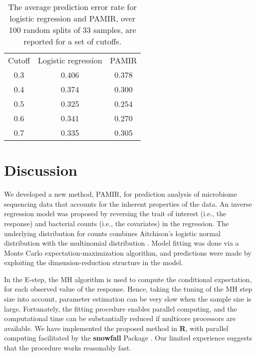 \documentclass[12pt]{article}
\begin{document}
\begin{table}[htb!]\caption{The average prediction error rate for logistic regression and PAMIR, over 100 random splits of 33 samples, are reported for a set of cutoffs.} \label{cutpoints} \vspace{-0.3cm}
\centering
 {\small\scriptsize%
\renewcommand{\arraystretch}{1} %
\begin{tabular}{ccc}
\hline
Cutoff & Logistic regression & PAMIR \\
0.3  &  0.406 & 0.378 \\
0.4  &  0.374 & 0.300 \\
0.5  &  0.325 & 0.254 \\
0.6  &  0.341 & 0.270 \\
0.7  &  0.335 & 0.305 \\
\hline
\end{tabular} }%
\end{table}


\section{Discussion}\label{sec_disc}

We developed a new method, PAMIR, for prediction analysis of microbiome sequencing data that accounts for the inherent properties of the data. An inverse regression model was proposed by reversing the trait of interest (i.e., the response) and bacterial counts (i.e., the covariates) in the regression. The underlying distribution for counts combines Aitchison's logistic normal distribution with the multinomial distribution \citep{billheimer2001statistical}. Model fitting was done via a Monte Carlo expectation-maximization algorithm, and predictions were made by exploiting the dimension-reduction structure in the model. %

In the E-step, the MH algorithm is used to compute the conditional expectation, for each observed value of the response. Hence, taking the tuning of the MH step size into account, parameter estimation can be very slow when the sample size is large. Fortunately, the fitting procedure enables parallel computing, and the computational time can be substantially reduced if multicore processors are available. We have implemented the proposed method in \textbf{R}, with parallel computing facilitated by the \textbf{snowfall} Package \citep{Snowfall2015}. Our limited experience suggests that the procedure works reasonably fast.  %
\end{document}
